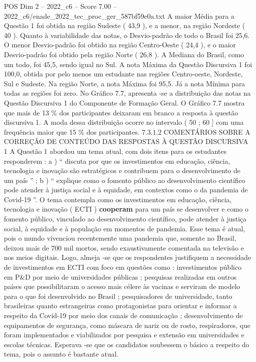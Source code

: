 \begin{textsample}{POS Dim 2 – 2022\_c6 – Score 7.00 – 2022\_c6/enade\_2022\_tec\_proc\_ger\_587bf59e0a.txt}
A maior Média para a Questão 1 foi obtida na região Sudeste ( 43,9 ), e a menor, na região Nordeste ( 40 ).
Quanto à variabilidade das notas, o Desvio-padrão de todo o Brasil foi 25,6.
O menor Desvio-padrão foi obtido na região Centro-Oeste ( 24,4 ), e o maior Desvio-padrão foi obtido pela região Norte ( 26,8 ).
A Mediana do Brasil, como um todo, foi 45,5, sendo igual no Sul.
A nota Máxima da Questão Discursiva 1 foi 100,0, obtida por pelo menos um estudante nas regiões Centro-oeste, Nordeste, Sul e Sudeste.
Na região Norte, a nota Máxima foi 95,5.
Já a nota Mínima para todas as regiões foi zero.
No Gráfico 7.7, apresenta -se a distribuição das notas na Questão Discursiva 1 do Componente de Formação Geral.
O Gráfico 7.7 mostra que mais de 13 \% dos participantes deixaram em branco a resposta à questão discursiva 1.
A moda dessa distribuição ocorre no intervalo ( 50 ; 60 ] com uma frequência maior que 15 \% dos participantes. 7.3.1.2 COMENTÁRIOS SOBRE A CORREÇÃO DE CONTEÚDO DAS RESPOSTAS À QUESTÃO DISCURSIVA 1 A Questão 1 abordou um tema atual, com dois itens para os estudantes responderem : a ) “ discuta por que os investimentos em educação, ciência, tecnologia e inovação são estratégicos e contribuem para o desenvolvimento de um país ” ; b ) “ explique como o fomento público ao desenvolvimento científico pode atender à justiça social e à equidade, em contextos como o da pandemia de Covid-19 ”.
O tema contempla como os investimentos em educação, ciência, tecnologia e inovação ( ECTI ) \textbf{cooperam} para um país se desenvolver e como o fomento público, vinculado ao desenvolvimento científico, pode atender à justiça social, à equidade e à população em momentos de pandemia.
Esse tema é atual, pois o mundo vivenciou recentemente uma pandemia que, somente no Brasil, deixou mais de 700 mil mortos, sendo exaustivamente comentada na televisão e nos meios digitais.
Logo, almeja -se que os respondentes justifiquem a necessidade de investimentos em ECTI com foco em questões como : investimentos público em P\&D por meio de universidades públicas ; pesquisas realizadas em outros países que possibilitaram o acesso mais célere às vacinas e serviram de modelo para o que foi desenvolvido no Brasil ; pesquisadores de universidade, tanto brasileiras quanto estrangeiras como protagonistas para orientar e informar a respeito da Covid-19 por meio dos canais de comunicação ; desenvolvimento de equipamentos de segurança, como máscara de nariz ou de rosto, respiradores, que foram implementados e viabilizados por pesquisa e extensão em universidades e escolas técnicas.
Esperava -se que os candidatos soubessem o básico a respeito do tema, pois o assunto é bastante atual.

\end{textsample}
